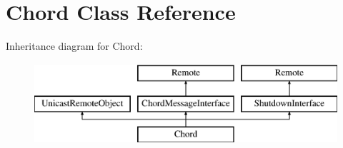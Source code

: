 \hypertarget{class_chord}{}\section{Chord Class Reference}
\label{class_chord}
Inheritance diagram for Chord\+:\begin{figure}[H]
\begin{center}
\leavevmode
\includegraphics[height=3.000000cm]{class_chord}
\end{center}
\end{figure}
